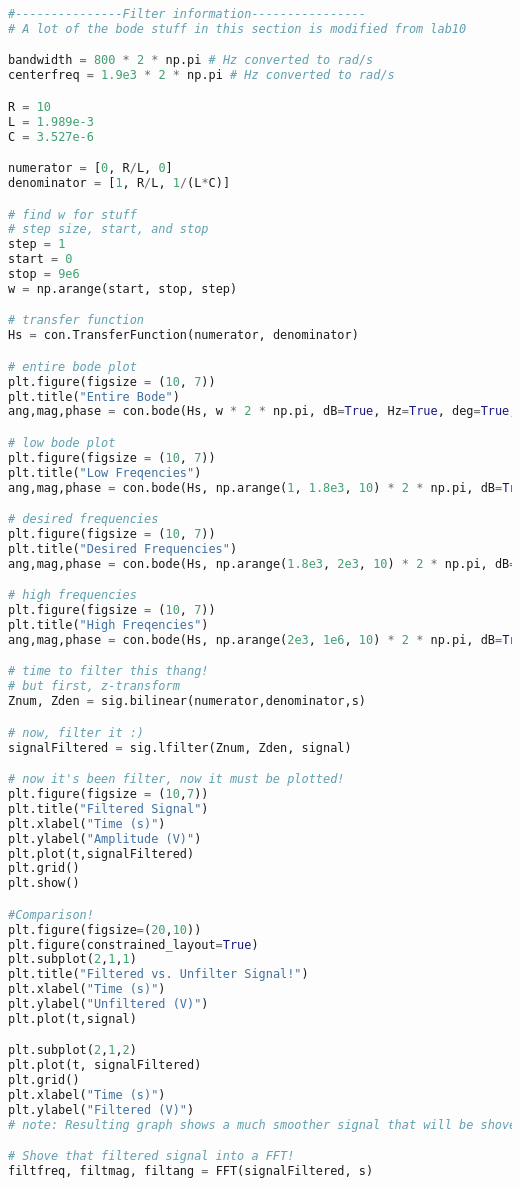\documentclass[12pt,a4paper]{article}
\begin{document}
\begin{lstlisting}[language=Python]
#---------------Filter information----------------
# A lot of the bode stuff in this section is modified from lab10

bandwidth = 800 * 2 * np.pi # Hz converted to rad/s
centerfreq = 1.9e3 * 2 * np.pi # Hz converted to rad/s

R = 10
L = 1.989e-3
C = 3.527e-6

numerator = [0, R/L, 0]
denominator = [1, R/L, 1/(L*C)]

# find w for stuff
# step size, start, and stop
step = 1
start = 0
stop = 9e6
w = np.arange(start, stop, step)

# transfer function
Hs = con.TransferFunction(numerator, denominator)

# entire bode plot
plt.figure(figsize = (10, 7))
plt.title("Entire Bode")
ang,mag,phase = con.bode(Hs, w * 2 * np.pi, dB=True, Hz=True, deg=True, plot=True)

# low bode plot
plt.figure(figsize = (10, 7))
plt.title("Low Freqencies")
ang,mag,phase = con.bode(Hs, np.arange(1, 1.8e3, 10) * 2 * np.pi, dB=True, Hz=True, deg=True, plot=True)

# desired frequencies
plt.figure(figsize = (10, 7))
plt.title("Desired Frequencies")
ang,mag,phase = con.bode(Hs, np.arange(1.8e3, 2e3, 10) * 2 * np.pi, dB=True, Hz=True, deg=True, plot=True)

# high frequencies
plt.figure(figsize = (10, 7))
plt.title("High Freqencies")
ang,mag,phase = con.bode(Hs, np.arange(2e3, 1e6, 10) * 2 * np.pi, dB=True, Hz=True, deg=True, plot=True)

# time to filter this thang!
# but first, z-transform
Znum, Zden = sig.bilinear(numerator,denominator,s)

# now, filter it :)
signalFiltered = sig.lfilter(Znum, Zden, signal)

# now it's been filter, now it must be plotted!
plt.figure(figsize = (10,7))
plt.title("Filtered Signal")
plt.xlabel("Time (s)")
plt.ylabel("Amplitude (V)")
plt.plot(t,signalFiltered)
plt.grid()
plt.show()

#Comparison!
plt.figure(figsize=(20,10))
plt.figure(constrained_layout=True)
plt.subplot(2,1,1)
plt.title("Filtered vs. Unfilter Signal!")
plt.xlabel("Time (s)")
plt.ylabel("Unfiltered (V)")
plt.plot(t,signal)

plt.subplot(2,1,2)
plt.plot(t, signalFiltered)
plt.grid()
plt.xlabel("Time (s)")
plt.ylabel("Filtered (V)")
# note: Resulting graph shows a much smoother signal that will be shoved in a FFT

# Shove that filtered signal into a FFT!
filtfreq, filtmag, filtang = FFT(signalFiltered, s)


\end{lstlisting}
\end{document}
